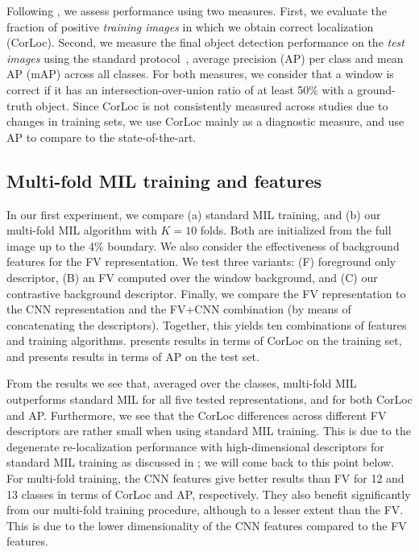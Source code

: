 \documentclass[10pt,journal,cspaper,final,twocolumn,compsoc]{./IEEEtran}
\begin{document}
Following \cite{deselaers12ijcv}, we assess performance
using two measures.  First, we evaluate the  fraction of
positive \emph{training images} in which we obtain correct
localization (CorLoc).  Second, we measure the
final object detection performance on the \emph{test images}
using the standard protocol~\cite{everingham10ijcv}, average precision (AP)
per class and mean AP (mAP) across all
classes.  For both measures, we consider that a window is
correct if it has an intersection-over-union ratio of at
least 50\% with a ground-truth object. 
Since CorLoc is not consistently measured across studies due to changes 
in training sets, we use CorLoc mainly as a diagnostic measure,
and use AP to compare to the state-of-the-art. 

\subsection{Multi-fold MIL training and features}\label{sec:DevEval}In our first experiment, we compare (a) standard MIL
training, and (b) our multi-fold MIL algorithm with $K=10$
folds. Both are initialized from the full image up to the
4\% boundary. We also consider the effectiveness of
background features for the FV representation. We test
three variants: (F) foreground only descriptor, (B)
an FV computed over the window background, and (C)
our contrastive background descriptor. Finally, we
compare the FV representation to the CNN representation and the FV+CNN combination (by means of concatenating the descriptors).
Together, this yields ten combinations of features and
training algorithms.  presents
results in terms of CorLoc on the training set,
and  presents results in terms of
AP on the test set.

From the results we see that, averaged over the classes,  multi-fold MIL outperforms standard MIL for all five tested representations, and for both CorLoc and AP.  Furthermore, we see that
the CorLoc differences across different FV descriptors are
rather small when using standard MIL training. This is due
to the degenerate re-localization performance with
high-dimensional descriptors for standard MIL training as
discussed in ; we will come back to this
point below.  For multi-fold training, the CNN
features give better results than FV for 12 and 13 classes
in terms of CorLoc and AP, respectively. They also benefit
significantly from our multi-fold training procedure,
although to a lesser extent than the FV. This is due to
the lower dimensionality of the CNN features compared to
the FV features.
\end{document}
